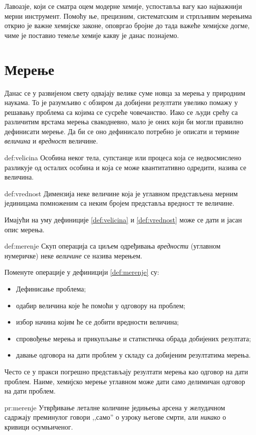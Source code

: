 Лавоазје, који се сматра оцем модерне хемије, успоставља вагу као
најважнији мерни инструмент. Помоћу ње, прецизним, систематским и
стрпљивим мерењима открио је важне хемијске законе, оповргао бројне
до тада важеће хемијске догме, чиме је поставио темеље хемије какву
је данас познајемо.


\section{Мерење}

Данас се у развијеном свету одвајају велике суме новца за мерења
у природним наукама. То је разумљиво с обзиром да добијени резултати
увелико помажу у решавању проблема са којима се сусреће човечанство.
Иако се људи срећу са различитим врстама мерења свакодневно, мало
је оних који би могли правилно дефинисати мерење. Да би се оно
дефинисало потребно је описати и термине \emph{величина} и
\emph{вредност} величине.

\begin{df}[Величина]{def:velicina}
  Особина неког тела, супстанце или процеса која се недвосмислено
  разликује од осталих особина и која се може квантитативно одредити,
  назива се величина.
\end{df}

\begin{df}[Вредност]{def:vrednost}
  Димензија неке величине која је углавном представљена мерним јединицама
  помноженим са неким бројем представља вредност те величине.
\end{df}

Имајући на уму дефиниције \ref{def:velicina} и \ref{def:vrednost} може
се дати и јасан опис мерења.

\begin{df}[Мерење]{def:merenje}
  Скуп операција са циљем одређивања \emph{вредности} (углавном
  нумеричке) неке \emph{величине} се назива мерењем.
\end{df}
Поменуте операције у дефиницији \ref{def:merenje} су:
\begin{itemize}[label={$\RHD$}]
\item Дефинисање проблема;
\item одабир величина које ће помоћи у одговору на проблем;
\item избор начина којим ће се добити вредности величина;
\item спровођење мерења и прикупљање и статистичка обрада
добијених резултата;
\item давање одговора на дати проблем у складу са добијеним
резултатима мерења.
\end{itemize}

Често се у пракси погрешно представљају резултати мерења као одговор
на дати проблем. Наиме, хемијско мерење углавном може дати само делимичан
одговор на дати проблем.
\begin{pr}[]{pr:merenje}
  Утврђивање леталне количине једињења арсена у желудачном садржају
  преминулог говори ,,само'' о узроку његове смрти, али \emph{никако}
  о кривици осумњиченог.
\end{pr}

\nocite{*}



